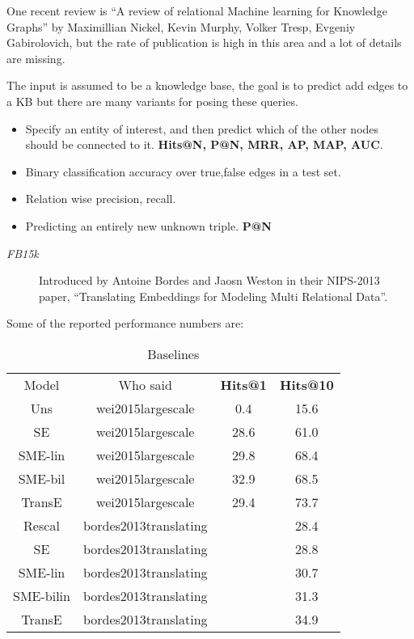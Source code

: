\documentclass{article}
\begin{document}
One recent review is ``A review of relational Machine learning for Knowledge Graphs'' by
Maximillian Nickel, Kevin Murphy, Volker Tresp, Evgeniy Gabirolovich, but the rate of publication is high in this area and a lot of details are missing.

The input is assumed to be a knowledge base, the goal is to predict add edges to a KB
but there are many variants for posing these queries.
\begin{itemize}
\item Specify an entity of interest, and then predict which of the other nodes should be connected to it. \textbf{Hits@N, P@N, MRR, AP, MAP, AUC}.
\item Binary classification accuracy over true,false edges in a test set.
\item Relation wise precision, recall.
\item Predicting an entirely new unknown triple. \textbf{P@N}
\end{itemize}

\begin{description}
\item[\textit{FB15k}] Introduced by Antoine Bordes and Jaosn Weston in their NIPS-2013 paper, ``Translating Embeddings for Modeling Multi Relational Data''.

\end{description}

Some of the reported performance numbers are:
\begin{table}[htbp]
  \centering
  \begin{tabular}{c c c c }
    Model & Who said & \textbf{Hits@1} & \textbf{Hits@10} \\
    Uns &  wei2015largescale &     0.4 &15.6\\
    SE& wei2015largescale &       28.6 &61.0\\
    SME-lin&wei2015largescale &   29.8 &68.4\\
    SME-bil&wei2015largescale &   32.9 &68.5\\
    TransE&wei2015largescale &    29.4 &73.7\\
    Rescal& bordes2013translating & &28.4\\
    SE& bordes2013translating & &28.8\\
    SME-lin& bordes2013translating & &30.7\\
    SME-bilin& bordes2013translating & &31.3\\
    TransE & bordes2013translating & &34.9\\
  \end{tabular}
  \caption{Baselines}
  \label{tab:baselines}
\end{table}
\end{document}
